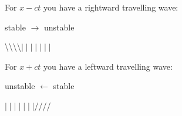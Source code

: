 For $x-ct$ you have a rightward travelling wave:
\begin{center}
stable \quad $\to$ \quad unstable

\textbackslash\textbackslash\textbackslash\textbackslash $\mid\mid\mid\mid\mid\mid\mid$
\end{center}

For $x+ct$ you have a leftward travelling wave:
\begin{center}
unstable \quad $\leftarrow$ \quad stable

$\mid\mid\mid\mid\mid\mid\mid$////
\end{center}


